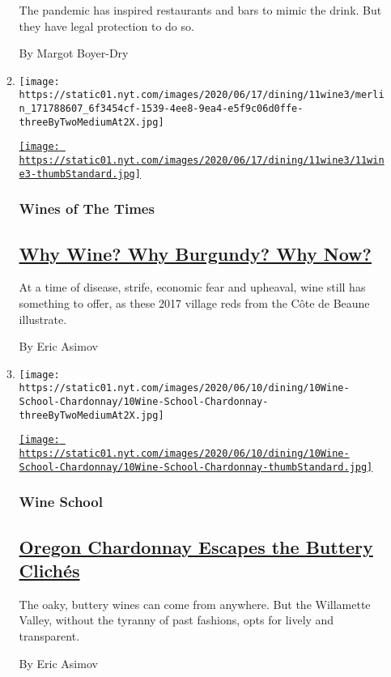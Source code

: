 \begin{enumerate}
\begin{enumerate}
    The pandemic has inspired restaurants and bars to mimic the drink.
    But they have legal protection to do so.

    By Margot Boyer-Dry
  \item
    \texttt{[image: https://static01.nyt.com/images/2020/06/17/dining/11wine3/merlin\_171788607\_6f3454cf-1539-4ee8-9ea4-e5f9c06d0ffe-threeByTwoMediumAt2X.jpg]}

    \href{/2020/06/11/dining/drinks/wine-review-cote-de-beaune-villages-red.html}{\texttt{[image: https://static01.nyt.com/images/2020/06/17/dining/11wine3/11wine3-thumbStandard.jpg]}}

    \hypertarget{wines-of-the-times}{%
    \subsubsection{Wines of The Times}\label{wines-of-the-times}}

    \hypertarget{why-wine-why-burgundy-why-now}{%
    \subsection{\texorpdfstring{\href{/2020/06/11/dining/drinks/wine-review-cote-de-beaune-villages-red.html}{Why
    Wine? Why Burgundy? Why
    Now?}}{Why Wine? Why Burgundy? Why Now?}}\label{why-wine-why-burgundy-why-now}}

    At a time of disease, strife, economic fear and upheaval, wine still
    has something to offer, as these 2017 village reds from the Côte de
    Beaune illustrate.

    By Eric Asimov
  \item
    \texttt{[image: https://static01.nyt.com/images/2020/06/10/dining/10Wine-School-Chardonnay/10Wine-School-Chardonnay-threeByTwoMediumAt2X.jpg]}

    \href{/2020/06/04/dining/drinks/wine-school-chardonnay-oregon.html}{\texttt{[image: https://static01.nyt.com/images/2020/06/10/dining/10Wine-School-Chardonnay/10Wine-School-Chardonnay-thumbStandard.jpg]}}

    \hypertarget{wine-school}{%
    \subsubsection{Wine School}\label{wine-school}}

    \hypertarget{oregon-chardonnay-escapes-the-buttery-clichuxe9s}{%
    \subsection{\texorpdfstring{\href{/2020/06/04/dining/drinks/wine-school-chardonnay-oregon.html}{Oregon
    Chardonnay Escapes the Buttery
    Clichés}}{Oregon Chardonnay Escapes the Buttery Clichés}}\label{oregon-chardonnay-escapes-the-buttery-clichuxe9s}}

    The oaky, buttery wines can come from anywhere. But the Willamette
    Valley, without the tyranny of past fashions, opts for lively and
    transparent.

    By Eric Asimov
  \end{enumerate}
\end{enumerate}

